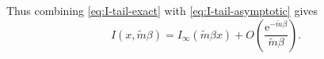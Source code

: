 \documentclass[a4paper,11pt]{article}
\newcommand{\e}{\mathrm e}
\newcommand{\dd}{\mathrm d}
\begin{document}
Thus  combining \eqref{eq:I-tail-exact} with
\eqref{eq:I-tail-asymptotic} gives
\begin{equation}
	I(x,\tilde m\beta)=I_\infty(\tilde m\beta x)
	+O\!\left(\frac{\e^{-\tilde m\beta}}{\tilde m\beta}\right).
	\label{eq:I-tail-estimate}
\end{equation}
%
%
%
\end{document}
